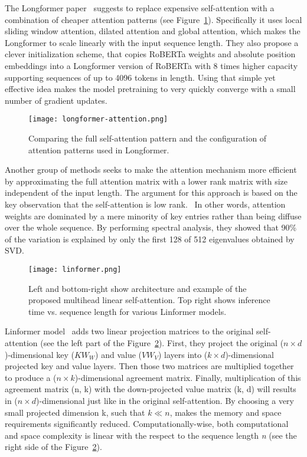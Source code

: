     The Longformer paper~\parencite{beltagy2020longformer} suggests to replace expensive self-attention with a combination of cheaper attention patterns (see Figure~\ref{fig:longformer-attention}). Specifically it uses local sliding window attention, dilated attention and global attention, which makes the Longformer to scale linearly with the input sequence length. They also propose a clever initialization scheme, that copies RoBERTa weights and absolute position embeddings into a Longformer version of RoBERTa with 8 times higher capacity supporting sequences of up to 4096 tokens in length. Using that simple yet effective idea makes the model pretraining to very quickly converge with a small number of gradient updates.
    \begin{figure}[H]
        \texttt{[image: longformer-attention.png]}
        \centering
        \caption[Self-attention patterns]{Comparing the full self-attention pattern and the configuration of attention patterns used in Longformer.~\parencite{beltagy2020longformer}}
        \label{fig:longformer-attention}
    \end{figure}

    Another group of methods seeks to make the attention mechanism more efficient by approximating the full attention matrix with a lower rank matrix with size independent of the input length. The argument for this approach is based on the key observation that the self-attention is low rank.~\parencite{wang2020linformer} In other words, attention weights are dominated by a mere minority of key entries rather than being diffuse over the whole sequence. By performing spectral analysis, they showed that 90\% of the variation is explained by only the first 128 of 512 eigenvalues obtained by SVD.
    
    \begin{figure}[H]
        \texttt{[image: linformer.png]}
        \centering
        \caption[Linformer]{Left and bottom-right show architecture and example of the proposed multihead linear self-attention. Top right shows inference time vs. sequence length for various Linformer models.~\parencite{wang2020linformer}}
        \label{fig:linformer}
    \end{figure}
    
    Linformer model~\parencite{wang2020linformer} adds two linear projection matrices to the original self-attention (see the left part of the Figure~\ref{fig:linformer}). First, they project the original ($n \times d$)-dimensional key ($KW_{W}$) and value ($VW_{V}$) layers into ($k \times d$)-dimensional projected key and value layers. Then those two matrices are multiplied together to produce a ($n \times k$)-dimensional agreement matrix. Finally, multiplication of this agreement matrix (n, k) with the down-projected value matrix (k, d) will results in ($n \times d$)-dimensional just like in the original self-attention. By choosing a very small projected dimension k, such that $k \ll n$, makes the memory and space requirements significantly reduced. Computationally-wise, both computational and space complexity is linear with the respect to the sequence length \emph{n} (see the right side of the Figure~\ref{fig:linformer}).
    
